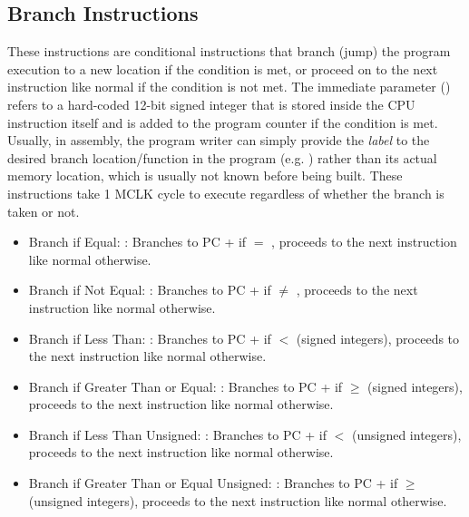 \documentclass[11pt,pdftex,portrait,letterpaper]{article}
\begin{document}
\subsection{Branch Instructions}

These instructions are conditional instructions that branch (jump) the program execution to a new location if the condition is met, or proceed on to the next instruction like normal if the condition is not met. The immediate parameter () refers to a hard-coded 12-bit signed integer that is stored inside the CPU instruction itself and is added to the program counter if the condition is met. Usually, in assembly, the program writer can simply provide the \textit{label} to the desired branch location/function in the program (e.g. ) rather than its actual memory location, which is usually not known before being built. These instructions take 1 MCLK cycle to execute regardless of whether the branch is taken or not.

\begin{itemize}
	\item Branch if Equal: : Branches to PC +  if  $=$ , proceeds to the next instruction like normal otherwise.
	\item Branch if Not Equal: : Branches to PC +  if  $\neq$ , proceeds to the next instruction like normal otherwise.
	\item Branch if Less Than: : Branches to PC +  if  $<$  (signed integers), proceeds to the next instruction like normal otherwise.
	\item Branch if Greater Than or Equal: : Branches to PC +  if  $\geq$  (signed integers), proceeds to the next instruction like normal otherwise.
	\item Branch if Less Than Unsigned: : Branches to PC +  if  $<$  (unsigned integers), proceeds to the next instruction like normal otherwise.
	\item Branch if Greater Than or Equal Unsigned: : Branches to PC +  if  $\geq$  (unsigned integers), proceeds to the next instruction like normal otherwise.
\end{itemize}
\end{document}
